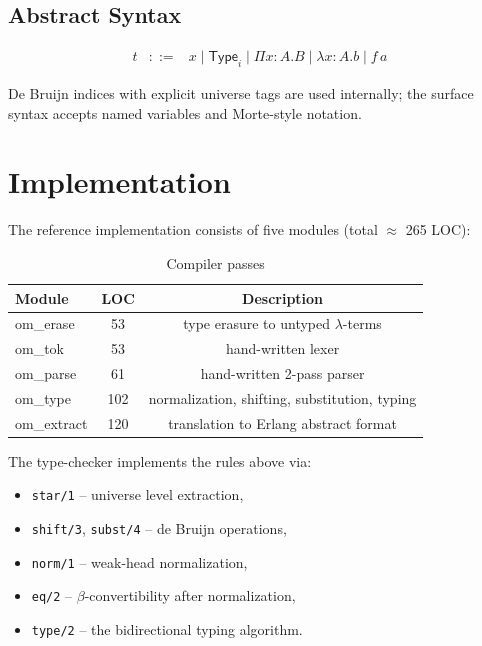 \documentclass{article}
\begin{document}
\subsection{Abstract Syntax}

\[
\begin{array}{rcl}
t &::=& x \mid \mathsf{Type}_i \mid \Pi x:A.B \mid \lambda x:A.b \mid f\,a
\end{array}
\]

De Bruijn indices with explicit universe tags are used internally; the surface syntax accepts named variables and Morte-style notation.

\section{Implementation}

The reference implementation consists of five modules (total $\approx$ 265 LOC):

\begin{table}[h]
\begin{center}
\caption{Compiler passes}
\begin{tabular}{lcc}
\hline
Module & LOC & Description \\
\hline
om\_erase   &  53 & type erasure to untyped $\lambda$-terms \\
om\_tok     &  53 & hand-written lexer \\
om\_parse   &  61 & hand-written 2-pass parser \\
om\_type    & 102 & normalization, shifting, substitution, typing \\
om\_extract & 120 & translation to Erlang abstract format \\
\hline
\end{tabular}
\end{center}
\end{table}

The type-checker implements the rules above via:
\begin{itemize}
\item \texttt{star/1} -- universe level extraction,
\item \texttt{shift/3}, \texttt{subst/4} -- de Bruijn operations,
\item \texttt{norm/1} -- weak-head normalization,
\item \texttt{eq/2} -- $\beta$-convertibility after normalization,
\item \texttt{type/2} -- the bidirectional typing algorithm.
\end{itemize}
\end{document}
